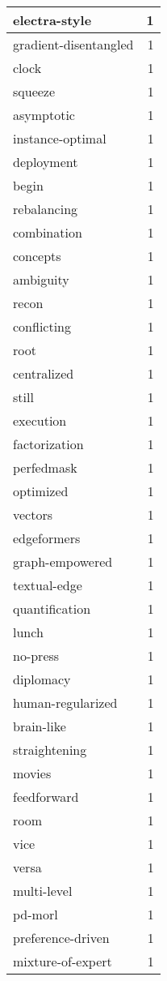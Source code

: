 \begin{table}[h]
\begin{tabular}{|l|r|}
\hline
electra-style & 1 \\
\hline
gradient-disentangled & 1 \\
\hline
clock & 1 \\
\hline
squeeze & 1 \\
\hline
asymptotic & 1 \\
\hline
instance-optimal & 1 \\
\hline
deployment & 1 \\
\hline
begin & 1 \\
\hline
rebalancing & 1 \\
\hline
combination & 1 \\
\hline
concepts & 1 \\
\hline
ambiguity & 1 \\
\hline
recon & 1 \\
\hline
conflicting & 1 \\
\hline
root & 1 \\
\hline
centralized & 1 \\
\hline
still & 1 \\
\hline
execution & 1 \\
\hline
factorization & 1 \\
\hline
perfedmask & 1 \\
\hline
optimized & 1 \\
\hline
vectors & 1 \\
\hline
edgeformers & 1 \\
\hline
graph-empowered & 1 \\
\hline
textual-edge & 1 \\
\hline
quantification & 1 \\
\hline
lunch & 1 \\
\hline
no-press & 1 \\
\hline
diplomacy & 1 \\
\hline
human-regularized & 1 \\
\hline
brain-like & 1 \\
\hline
straightening & 1 \\
\hline
movies & 1 \\
\hline
feedforward & 1 \\
\hline
room & 1 \\
\hline
vice & 1 \\
\hline
versa & 1 \\
\hline
multi-level & 1 \\
\hline
pd-morl & 1 \\
\hline
preference-driven & 1 \\
\hline
mixture-of-expert & 1 \\

\end{tabular}
\end{table}
